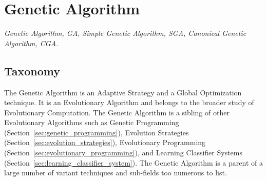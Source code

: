 

\section{Genetic Algorithm} 
\label{sec:genetic_algorithm}

\emph{Genetic Algorithm, GA, Simple Genetic Algorithm, SGA, Canonical Genetic Algorithm, CGA.}

\subsection{Taxonomy}
The Genetic Algorithm is an Adaptive Strategy and a Global Optimization technique. It is an Evolutionary Algorithm and belongs to the broader study of Evolutionary Computation.
The Genetic Algorithm is a sibling of other Evolutionary Algorithms such as Genetic Programming (Section~\ref{sec:genetic_programming}), Evolution Strategies (Section~\ref{sec:evolution_strategies}), Evolutionary Programming (Section~\ref{sec:evolutionary_programming}), and Learning Classifier Systems (Section~\ref{sec:learning_classifier_system}). The Genetic Algorithm is a parent of a large number of variant techniques and sub-fields too numerous to list.

